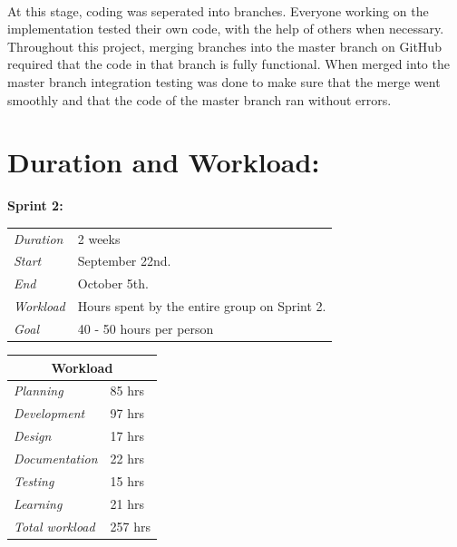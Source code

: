 \paragraph{} At this stage, coding was seperated into branches. Everyone working on the implementation tested their own code, with the help of others when necessary. Throughout this project, merging branches into the master branch on GitHub required that the code in that branch is fully functional. When merged into the master branch integration testing was done to make sure that the merge went smoothly and that the code of the master branch ran without errors.

\section{Duration and Workload:}
\label{sec:S2Duration}
\begin{minipage}{\linewidth}
\centering
\setlength{\tabcolsep}{22pt}
\textbf{Sprint 2:} 
\smallskip
{}
\begin{tabular}{ |l l| }
	\hline
	\it{Duration} & 2 weeks \\
	\it{Start} & September 22nd. \\
	\it{End} & October 5th. \\
	\it{Workload} & Hours spent by the entire group on Sprint 2. \\
	\it{Goal} & 40 - 50 hours per person \\
	\hline
\end{tabular}
\end{minipage}
%
\bigskip
%
\begin{minipage}{\linewidth}
\setlength{\tabcolsep}{25pt}
\centering
{}
\begin{tabular}{ |l|l| }
	\hline
	\multicolumn{2}{|c|}{\cellcolor{gray!25} Workload} \\
	\hline
	\it{Planning} & 85 hrs\\
	\it{Development} & 97 hrs \\
	\it{Design} & 17 hrs \\
	\it{Documentation} & 22 hrs \\
	\it{Testing} & 15 hrs \\
	\it{Learning} & 21 hrs \\
	\hline
	\it{Total workload} & 257 hrs \\
	\hline
\end{tabular}
\end{minipage}

